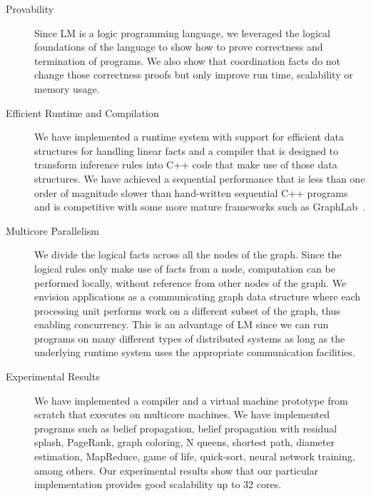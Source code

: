 \begin{description}
   \item[Provability]
   
   Since LM is a logic programming language, we leveraged the logical
   foundations of the language to show how to prove correctness and termination
   of programs. We also show that coordination facts do not change those
   correctness proofs but only improve run time, scalability or memory usage.

\item[Efficient Runtime and Compilation]

   We have implemented a runtime system with support for efficient data
   structures for handling linear facts and a compiler that is designed to
   transform inference rules into C++ code that make use of those data
   structures. We have achieved a sequential performance that is less than one
   order of magnitude slower than hand-written sequential C++ programs and is
   competitive with some more mature frameworks such as
   GraphLab~\cite{GraphLab2010}.

\item[Multicore Parallelism]
   
   We divide the logical facts across all the nodes of the graph. Since the
   logical rules only make use of facts from a node, computation can be
   performed locally, without reference from other nodes of the graph.
   We envision applications as a communicating graph data structure where
   each processing unit performs work on a different subset of the graph, thus
   enabling concurrency. This is an advantage of LM since we can run programs on
   many different types of distributed systems as long as the underlying runtime
   system uses the appropriate communication facilities.

\item[Experimental Results]

   We have implemented a compiler and a virtual machine prototype from
   scratch that executes on multicore machines.  We have implemented programs
   such as belief propagation, belief propagation with residual splash,
   PageRank, graph coloring, N queens, shortest path, diameter estimation,
   MapReduce, game of life, quick-sort, neural network training, among others.
   Our experimental results show that our particular implementation provides
   good scalability up to 32 cores.
   
\end{description}
